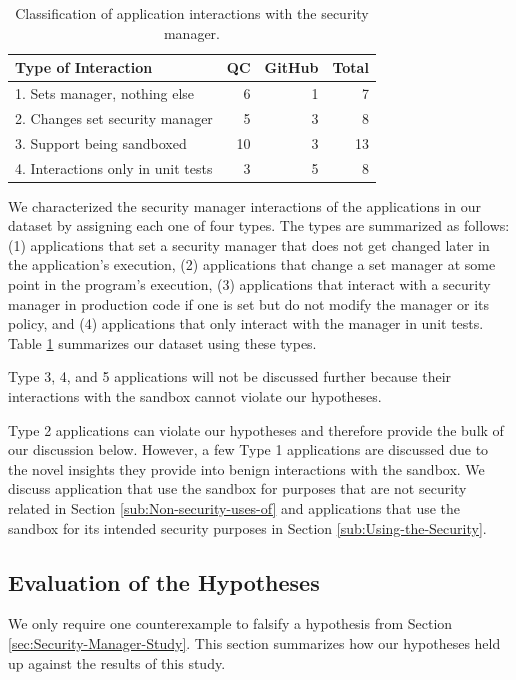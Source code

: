 \documentclass{sig-alternate}
\begin{document}
\begin{table}
\caption{Classification of application
  interactions \label{tab:Classification-of-Application}
with the security manager.}


\centering{}%
\begin{tabular}{lrrr}
\toprule 
Type of Interaction & QC & GitHub & Total\tabularnewline
\midrule
1. Sets manager, nothing else & 6 & 1 & 7\tabularnewline
2. Changes set security manager & 5 & 3 & 8\tabularnewline
3. Support being sandboxed & 10 & 3 & 13\tabularnewline
4. Interactions only in unit tests & 3 & 5 & 8\tabularnewline
\bottomrule
\end{tabular}
\end{table}



We characterized the security manager interactions of the applications in our
dataset by assigning each one of four types. The
types are summarized as follows: (1) applications that set a
security manager that does not get changed later in the application's
execution, (2) applications that change a set manager at some point
in the program's execution, (3) applications that interact with a
security manager in production code if one is set but do not modify the manager
or its policy, and (4) applications
that only interact with the manager in unit tests. Table \ref{tab:Classification-of-Application}
summarizes our dataset using these types.

Type 3, 4, and 5 applications will not be discussed further because their interactions with the sandbox cannot violate our hypotheses.

Type 2 applications can violate our hypotheses and therefore provide the bulk of our discussion below. However, a few Type 1 applications are discussed due to the novel insights they provide into benign interactions with the sandbox. We discuss application that use the sandbox for purposes that are not security related in Section \ref{sub:Non-security-uses-of}
and applications that use the sandbox for its intended security purposes in Section \ref{sub:Using-the-Security}.

\subsection{Evaluation of the Hypotheses}\label{sub:Evaluation-of-the-hypotheses}

We only require one counterexample to falsify a hypothesis from Section
\ref{sec:Security-Manager-Study}. This section summarizes how our
hypotheses held up against the results of this study.
\end{document}
